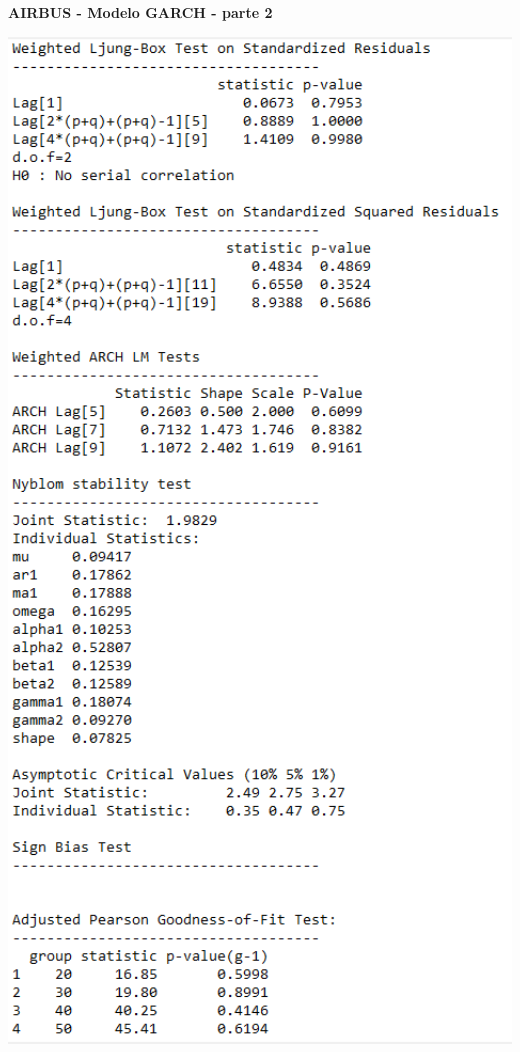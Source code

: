 \documentclass[
  12pt,
  a4paper,
  openany]{book}
\begin{document}
\begin{center}
 {\normalfont\Large\bfseries AIRBUS - Modelo GARCH - parte 2}
\end{center}

\begin{center}
\begin{minipage}{0.90\linewidth}
    \centering
    \includegraphics[width=2\textwidth]{image/air2.png}
\end{minipage}
\end{center}
\end{document}

